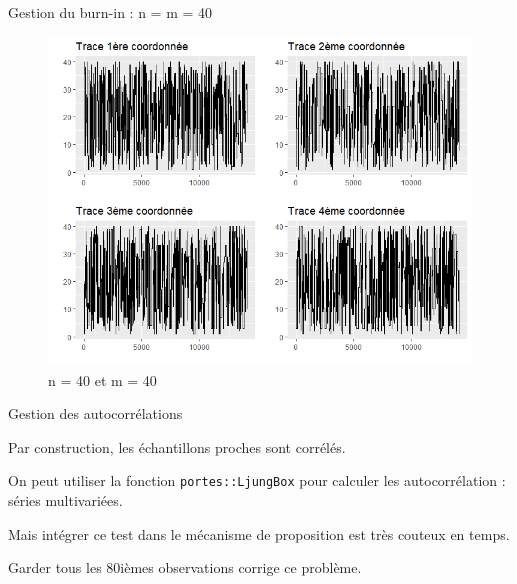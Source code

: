 \documentclass[10pt,xcolor=table,color={dvipsnames,usenames},ignorenonframetext,usepdftitle=false,french]{beamer}
\begin{document}
\begin{frame}{Gestion du burn-in : n = m = 40}

\begin{figure}
\centering
\includegraphics{img/n_40_m_40.png}
\caption{n = 40 et m = 40}
\end{figure}

\end{frame}

\begin{frame}[fragile]{Gestion des autocorrélations}

Par construction, les échantillons proches sont corrélés.

On peut utiliser la fonction \texttt{portes::LjungBox} pour calculer les
autocorrélation : séries multivariées.

Mais intégrer ce test dans le mécanisme de proposition est très couteux
en temps.

Garder tous les 80ièmes observations corrige ce problème.

\end{frame}
\end{document}

